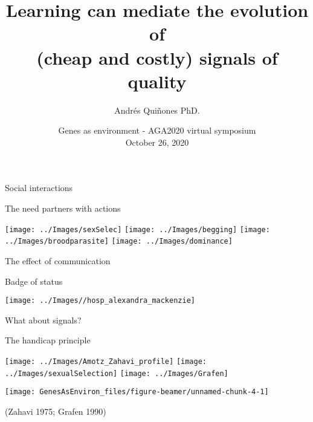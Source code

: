 \documentclass[
  ignorenonframetext,
]{beamer}
\title{Learning can mediate the evolution of\\
(cheap and costly) signals of quality}
\author{Andrés Quiñones PhD.}
\date{Genes as environment - AGA2020 virtual symposium\\
October 26, 2020}
\begin{document}
\frame{\titlepage}

\begin{frame}{Social interactions}
\protect\hypertarget{social-interactions}{}

\begin{block}{The need partners with actions}

\begin{center}\texttt{[image: ../Images/sexSelec]} \texttt{[image: ../Images/begging]} \texttt{[image: ../Images/broodparasite]} \texttt{[image: ../Images/dominance]} \end{center}

\end{block}

\end{frame}

\begin{frame}{The effect of communication}
\protect\hypertarget{the-effect-of-communication}{}

\begin{block}{Badge of status}

\begin{center}\texttt{[image: ../Images//hosp\_alexandra\_mackenzie]} \end{center}

\end{block}

\end{frame}

\begin{frame}{What about signals?}
\protect\hypertarget{what-about-signals}{}

\begin{block}{The handicap principle}

\begin{center}\texttt{[image: ../Images/Amotz\_Zahavi\_profile]} \texttt{[image: ../Images/sexualSelection]} \texttt{[image: ../Images/Grafen]} \end{center}

\begin{center}\texttt{[image: GenesAsEnviron\_files/figure-beamer/unnamed-chunk-4-1]} \end{center}

(Zahavi 1975; Grafen 1990)

\end{block}

\end{frame}
\end{document}
